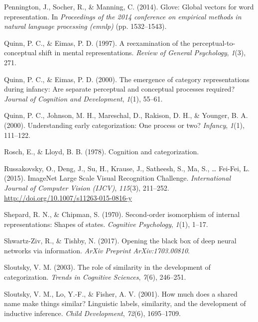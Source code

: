 \documentclass[10pt, letterpaper]{article}
\begin{document}
\hypertarget{ref-pennington2014glove}{}
Pennington, J., Socher, R., \& Manning, C. (2014). Glove: Global vectors
for word representation. In \emph{Proceedings of the 2014 conference on
empirical methods in natural language processing (emnlp)} (pp.
1532--1543).

\hypertarget{ref-quinn1997reexamination}{}
Quinn, P. C., \& Eimas, P. D. (1997). A reexamination of the
perceptual-to-conceptual shift in mental representations. \emph{Review
of General Psychology}, \emph{1}(3), 271.

\hypertarget{ref-quinn2000emergence}{}
Quinn, P. C., \& Eimas, P. D. (2000). The emergence of category
representations during infancy: Are separate perceptual and conceptual
processes required? \emph{Journal of Cognition and Development},
\emph{1}(1), 55--61.

\hypertarget{ref-quinn2000understanding}{}
Quinn, P. C., Johnson, M. H., Mareschal, D., Rakison, D. H., \& Younger,
B. A. (2000). Understanding early categorization: One process or two?
\emph{Infancy}, \emph{1}(1), 111--122.

\hypertarget{ref-rosch1978cognition}{}
Rosch, E., \& Lloyd, B. B. (1978). Cognition and categorization.

\hypertarget{ref-ILSVRC15}{}
Russakovsky, O., Deng, J., Su, H., Krause, J., Satheesh, S., Ma, S.,
\ldots{} Fei-Fei, L. (2015). ImageNet Large Scale Visual Recognition
Challenge. \emph{International Journal of Computer Vision (IJCV)},
\emph{115}(3), 211--252. \url{http://doi.org/10.1007/s11263-015-0816-y}

\hypertarget{ref-shepard1970second}{}
Shepard, R. N., \& Chipman, S. (1970). Second-order isomorphism of
internal representations: Shapes of states. \emph{Cognitive Psychology},
\emph{1}(1), 1--17.

\hypertarget{ref-shwartz2017opening}{}
Shwartz-Ziv, R., \& Tishby, N. (2017). Opening the black box of deep
neural networks via information. \emph{ArXiv Preprint ArXiv:1703.00810}.

\hypertarget{ref-sloutsky2003role}{}
Sloutsky, V. M. (2003). The role of similarity in the development of
categorization. \emph{Trends in Cognitive Sciences}, \emph{7}(6),
246--251.

\hypertarget{ref-sloutsky2001much}{}
Sloutsky, V. M., Lo, Y.-F., \& Fisher, A. V. (2001). How much does a
shared name make things similar? Linguistic labels, similarity, and the
development of inductive inference. \emph{Child Development},
\emph{72}(6), 1695--1709.
\end{document}
